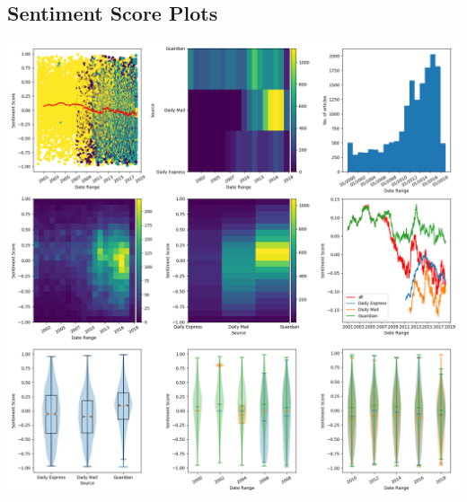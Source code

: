 \documentclass{report}
\begin{document}
\subsection{Sentiment Score Plots}
\includegraphics[width=\textwidth]{raw/disabled.png}
\end{document}
